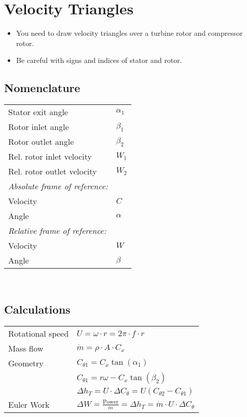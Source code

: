 




\section*{Velocity Triangles}
\begin{itemize}
	\item You need to draw velocity triangles over a turbine rotor and compressor rotor.
	\item Be careful with signs and indices of stator and rotor.
\end{itemize}

\subsection*{Nomenclature} 
\begin{tabular}{ m{5cm} l}
	Stator exit angle & $\alpha_1$\\
	Rotor inlet angle & $\beta_1$ \\
	Rotor outlet angle & $\beta_2$ \\
	Rel. rotor inlet velocity & $W_1$ \\
	Rel. rotor outlet velocity & $W_2$ \\
   \textit{ Absolute frame of reference:} & \\
    Velocity & $C$ \\
    Angle & $\alpha$ \\
    \textit{Relative frame of reference:} & \\
    Velocity & $W$ \\
    Angle & $\beta$ \\
\end{tabular} \\

\subsection*{Calculations} 
\begin{tabular}{ m{5cm} l}
	Rotational speed & $U = \omega \cdot r = 2 \pi \cdot f \cdot r$ \\
	Mass flow & $\dot{m} = \rho \cdot A \cdot C_x $ \\
	Geometry & $C_{\theta 1 } = C_x \tan( \alpha_1 ) $ \\
		& $C_{\theta 1} = r \omega - C_x \tan \left( \beta_2 \right) $ \\
		& $\Delta h_T = U \cdot \Delta C_\theta = U \left(C_{\theta 2} - C _{\theta 1} \right) $ \\
	Euler Work & $\Delta W = \frac{\text{Power}}{\dot{m}} = \Delta h_T = \dot{m} \cdot U \cdot \Delta C_\theta$
\end{tabular}


